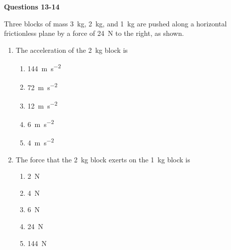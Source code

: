 \documentclass{../../oss-apphys}
\begin{document}
\begin{multicols}{2}
\begin{enumerate}[resume,leftmargin=18pt]
  \end{enumerate}
  \columnbreak
  
  \textbf{Questions 13-14}

  Three blocks of mass \SI{3}{\kilo\gram}, \SI{2}{\kilo\gram}, and
  \SI{1}{\kilo\gram} are pushed along a horizontal frictionless plane by a
  force of \SI{24}{\newton} to the right, as shown.
  \begin{center}
  \end{center}
  \begin{enumerate}[resume,leftmargin=18pt]
  \item The acceleration of the \SI{2}{\kilo\gram} block is
    \begin{enumerate}[noitemsep,topsep=0pt,leftmargin=18pt,label=(\Alph*)]
    \item\SI{144}{\metre\per\second^2}
    \item\SI{72 }{\metre\per\second^2}
    \item\SI{12 }{\metre\per\second^2}
    \item\SI{6  }{\metre\per\second^2}
    \item\SI{4  }{\metre\per\second^2}
    \end{enumerate}

  \item The force that the \SI{2}{\kilo\gram} block exerts on the
    \SI{1}{\kilo\gram} block is
    \begin{enumerate}[noitemsep,topsep=0pt,leftmargin=18pt,label=(\Alph*)]
    \item \SI{2}{\newton}
    \item \SI{4}{\newton}
    \item \SI{6}{\newton}
    \item \SI{24}{\newton}
    \item \SI{144}{\newton}
    \end{enumerate}


\end{enumerate}
\end{multicols}
\end{document}
